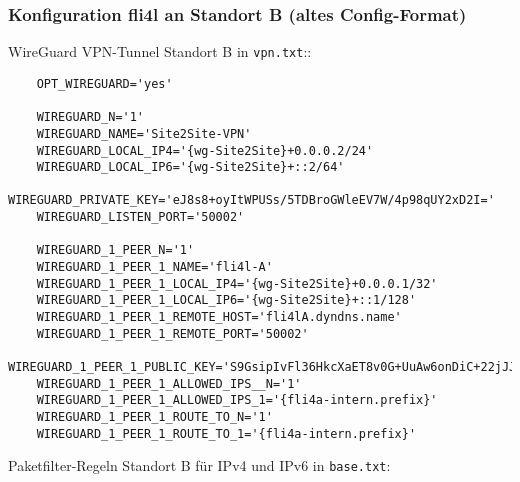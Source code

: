 
\subsubsection{Konfiguration fli4l an Standort B (altes Config-Format)}

\noindent

WireGuard VPN-Tunnel Standort B in \verb+vpn.txt+::

\begin{example}
\begin{verbatim}
    OPT_WIREGUARD='yes'

    WIREGUARD_N='1'
    WIREGUARD_NAME='Site2Site-VPN'
    WIREGUARD_LOCAL_IP4='{wg-Site2Site}+0.0.0.2/24'
    WIREGUARD_LOCAL_IP6='{wg-Site2Site}+::2/64'
    WIREGUARD_PRIVATE_KEY='eJ8s8+oyItWPUSs/5TDBroGWleEV7W/4p98qUY2xD2I='
    WIREGUARD_LISTEN_PORT='50002'

    WIREGUARD_1_PEER_N='1'
    WIREGUARD_1_PEER_1_NAME='fli4l-A'
    WIREGUARD_1_PEER_1_LOCAL_IP4='{wg-Site2Site}+0.0.0.1/32'
    WIREGUARD_1_PEER_1_LOCAL_IP6='{wg-Site2Site}+::1/128'
    WIREGUARD_1_PEER_1_REMOTE_HOST='fli4lA.dyndns.name'
    WIREGUARD_1_PEER_1_REMOTE_PORT='50002'
    WIREGUARD_1_PEER_1_PUBLIC_KEY='S9GsipIvFl36HkcXaET8v0G+UuAw6onDiC+22jJJjVs='
    WIREGUARD_1_PEER_1_ALLOWED_IPS__N='1'
    WIREGUARD_1_PEER_1_ALLOWED_IPS_1='{fli4a-intern.prefix}'
    WIREGUARD_1_PEER_1_ROUTE_TO_N='1'
    WIREGUARD_1_PEER_1_ROUTE_TO_1='{fli4a-intern.prefix}'
\end{verbatim}
\end{example}


Paketfilter-Regeln Standort B für IPv4 und IPv6 in \verb+base.txt+:

